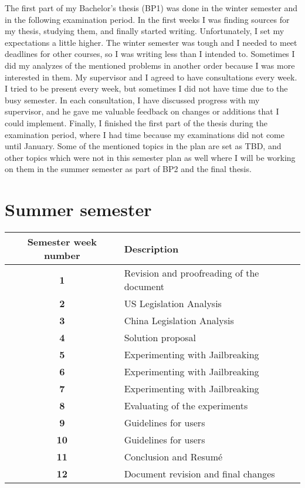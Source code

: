 The first part of my Bachelor's thesis (BP1) was done in the winter semester and in the following examination period. In the first weeks I was finding sources for my thesis, studying them, and finally started writing. Unfortunately, I set my expectations a little higher. The winter semester was tough and I needed to meet deadlines for other courses, so I was writing less than I intended to. Sometimes I did my analyzes of the mentioned problems in another order because I was more interested in them. My supervisor and I agreed to have consultations every week. I tried to be present every week, but sometimes I did not have time due to the busy semester. In each consultation, I have discussed progress with my supervisor, and he gave me valuable feedback on changes or additions that I could implement. Finally, I finished the first part of the thesis during the examination period, where I had time because my examinations did not come until January. Some of the mentioned topics in the plan are set as TBD, and other topics which were not in this semester plan as well where I will be working on them in the summer semester as part of BP2 and the final thesis.


\newpage


\section*{Summer semester}

{
    \renewcommand{\arraystretch}{1.2}
    \begin{table}[htpb]
        \centering
        \begin{tabular}{|c|l|}
        \hline
        \cellcolor[gray]{0.8}\textbf{Semester week number} & \cellcolor[gray]{0.8}\textbf{Description} \\ \hline
    
        \textbf{1} & Revision and proofreading of the document \\ \hline
        \textbf{2} & US Legislation Analysis \\ \hline
        \textbf{3} & China Legislation Analysis \\ \hline
        \textbf{4} & Solution proposal \\ \hline
        \textbf{5} & Experimenting with Jailbreaking \\ \hline
        \textbf{6} & Experimenting with Jailbreaking \\ \hline
        \textbf{7} & Experimenting with Jailbreaking \\ \hline
        \textbf{8} & Evaluating of the experiments \\ \hline
        \textbf{9} & Guidelines for users \\ \hline
        \textbf{10} & Guidelines for users \\ \hline
        \textbf{11} & Conclusion and Resumé \\ \hline
        \textbf{12} & Document revision and final changes \\ \hline
        \end{tabular}
    \end{table}
}

